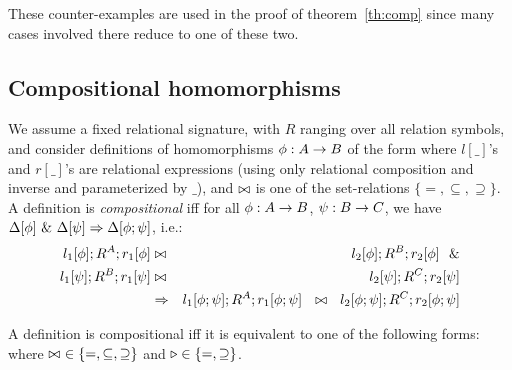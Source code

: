 \documentclass[10pt]{article}
\begin{document}
\noindent
These counter-examples are used in the proof of 
theorem~\ref{th:comp} since many cases involved there reduce to one of these two.

 \subsection{Compositional homomorphisms}\label{sub:comp}
%
We assume a fixed relational signature, with $R$ ranging over all relation symbols, 
and consider definitions  of homomorphisms $\phi:A\rightarrow B$ of the form
where $l[\_]$'s and $r[\_]$'s are relational expressions
(using only relational composition
and inverse and parameterized by $\_$), and $\bowtie$ is one of the set-relations
$\{=,\subseteq,\supseteq\}$. A definition is {\em compositional} iff
for all $\phi:A\rightarrow B$, $\psi:B\rightarrow C$, we have 
$\Delta[\phi]\ \&\ \Delta[\psi]\Rightarrow \Delta[\phi;\psi]$, i.e.:
\begin{eqnarray}
l_1[\phi];R^A;r_1[\phi] & \any & l_2[\phi];R^B;r_2[\phi]\ \ \& \nonumber \\
l_1[\psi];R^B;r_1[\psi] & \any & l_2[\psi];R^C;r_2[\psi] \\
  & \impl & l_1[\phi;\psi];R^A;r_1[\phi;\psi]\ \ \any\ \
    l_2[\phi;\psi];R^C;r_2[\phi;\psi] \nonumber
\end{eqnarray}


\begin{Theorem}\label{th:comp}
A definition is compositional iff it is equivalent to one of the
following forms: 
where $\bowtie\ \in\{=,\subseteq,\supseteq\}$ and
$\triangleright\in\{=,\supseteq\}$.
\end{Theorem}
\end{document}
